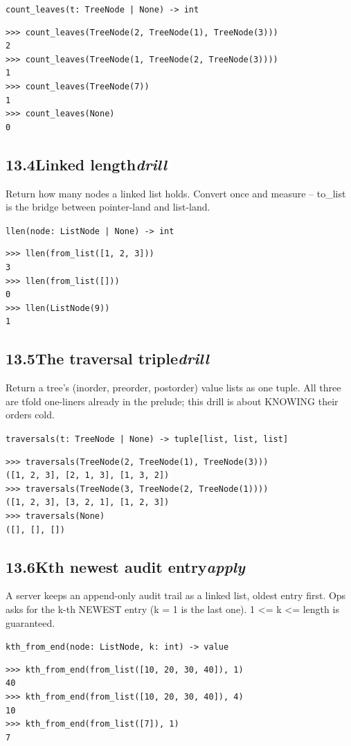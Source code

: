 \documentclass[10pt,letterpaper]{book}
\begin{document}
\noindent\texttt{count\_leaves(t: TreeNode | None) -> int}
\begin{lstlisting}[style=ex]
>>> count_leaves(TreeNode(2, TreeNode(1), TreeNode(3)))
2
>>> count_leaves(TreeNode(1, TreeNode(2, TreeNode(3))))
1
>>> count_leaves(TreeNode(7))
1
>>> count_leaves(None)
0
\end{lstlisting}
\subsection*{13.4\quad Linked length\hfill\textnormal{\textit{drill}}}
Return how many nodes a linked list holds. Convert once and measure -- to\_list is the bridge between pointer-land and list-land.

\noindent\texttt{llen(node: ListNode | None) -> int}
\begin{lstlisting}[style=ex]
>>> llen(from_list([1, 2, 3]))
3
>>> llen(from_list([]))
0
>>> llen(ListNode(9))
1
\end{lstlisting}
\subsection*{13.5\quad The traversal triple\hfill\textnormal{\textit{drill}}}
Return a tree's (inorder, preorder, postorder) value lists as one tuple. All three are tfold one-liners already in the prelude; this drill is about KNOWING their orders cold.

\noindent\texttt{traversals(t: TreeNode | None) -> tuple[list, list, list]}
\begin{lstlisting}[style=ex]
>>> traversals(TreeNode(2, TreeNode(1), TreeNode(3)))
([1, 2, 3], [2, 1, 3], [1, 3, 2])
>>> traversals(TreeNode(3, TreeNode(2, TreeNode(1))))
([1, 2, 3], [3, 2, 1], [1, 2, 3])
>>> traversals(None)
([], [], [])
\end{lstlisting}
\subsection*{13.6\quad Kth newest audit entry\hfill\textnormal{\textit{apply}}}
A server keeps an append-only audit trail as a linked list, oldest entry first. Ops asks for the k-th NEWEST entry (k = 1 is the last one). 1 <= k <= length is guaranteed.

\noindent\texttt{kth\_from\_end(node: ListNode, k: int) -> value}
\begin{lstlisting}[style=ex]
>>> kth_from_end(from_list([10, 20, 30, 40]), 1)
40
>>> kth_from_end(from_list([10, 20, 30, 40]), 4)
10
>>> kth_from_end(from_list([7]), 1)
7
\end{lstlisting}
\end{document}

